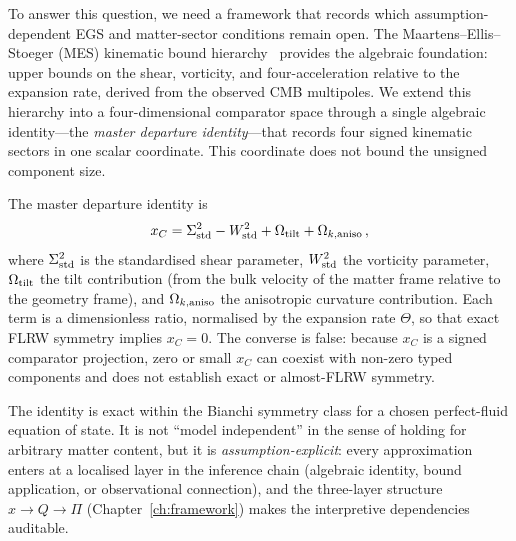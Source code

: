 To answer this question, we need a framework that records which
assumption-dependent EGS and matter-sector conditions remain open.
The Maartens--Ellis--Stoeger (MES) kinematic bound
hierarchy~\cite{MES1995a,StoegerME1995} provides the
algebraic foundation: upper bounds on the shear, vorticity,
and four-acceleration relative to the expansion rate, derived
from the observed CMB multipoles.  We extend this hierarchy
into a four-dimensional comparator space through a single
algebraic identity---the \emph{master departure identity}---that
records four signed kinematic sectors in one scalar coordinate.
This coordinate does not bound the unsigned component size.



The master departure identity is
\begin{equation}\label{eq:intro-MES}
x_C = \Sigma^2_{\mathrm{std}} - W^2_{\mathrm{std}} + \Omega_{\mathrm{tilt}} + \Omega_{k,\mathrm{aniso}}\,,
\end{equation}
where $\Sigma^2_{\mathrm{std}}$ is the standardised shear parameter, $W^2_{\mathrm{std}}$
the vorticity parameter, $\Omega_{\mathrm{tilt}}$ the tilt contribution
(from the bulk velocity of the matter frame relative to the
geometry frame), and $\Omega_{k,\mathrm{aniso}}$ the anisotropic curvature
contribution.  Each term is a dimensionless ratio,
normalised by the expansion rate $\Theta$, so that
exact FLRW symmetry implies $x_C = 0$.  The converse is false:
because $x_C$ is a signed comparator projection, zero or small
$x_C$ can coexist with non-zero typed components and does not
establish exact or almost-FLRW symmetry.

The identity is exact within the Bianchi symmetry class for a
chosen perfect-fluid equation of state.  It is not ``model
independent'' in the sense of holding for arbitrary matter
content, but it is \emph{assumption-explicit}: every
approximation enters at a localised layer in the inference
chain (algebraic identity, bound application, or
observational connection), and the three-layer structure
$x \to Q \to \Pi$ (Chapter~\ref{ch:framework}) makes the
interpretive dependencies auditable.

